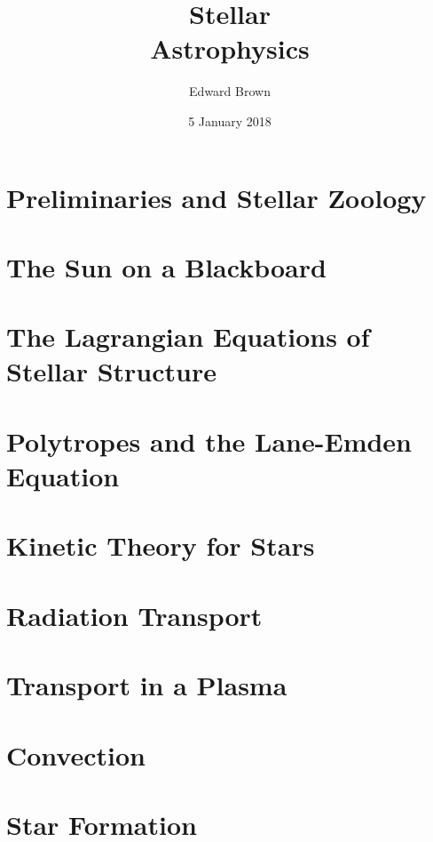 \documentclass{astro-bookshelf}
\title{Stellar\\Astrophysics}
\author{Edward Brown}
\date{5 January 2018}
\begin{document}
\frontmatter
{}


\mainmatter
{}
\setcounter{page}{1}


\chapter[Preliminaries]{Preliminaries and Stellar Zoology}\label{ch.prelim}


\chapter{The Sun on a Blackboard}\label{ch.introduction}


\chapter[Equations of Stellar Structure]{The Lagrangian Equations of Stellar Structure}\label{ch.stellar-structure-eqn}


\chapter[Polytropes]{Polytropes and the Lane-Emden Equation}\label{ch.polytropes}


\chapter[Kinetic Theory]{Kinetic Theory for Stars}\label{ch.kinetic}


\chapter{Radiation Transport}


\chapter{Transport in a Plasma}\label{ch.plasma-transport}


\chapter{Convection}\label{s.convection}


\chapter{Star Formation}\label{ch.star-formation}

\end{document}
